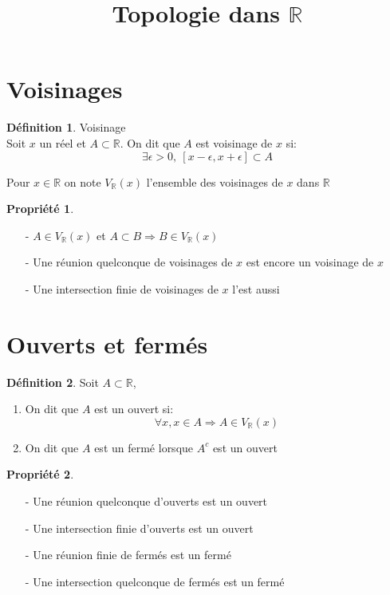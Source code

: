 \documentclass[fleqn]{article}
\title{Topologie dans $\mathbb{R}$}
\date{}
\theoremstyle{definition} \newtheorem*{defi}{D\'efinition}
\theoremstyle{definition} \newtheorem*{theo}{Th\'eor\`eme}
\theoremstyle{definition} \newtheorem*{adh}{Caract\'erisation s\'equentielle de l'adh\'erence}
\theoremstyle{definition} \newtheorem*{prop}{Propri\'et\'e}
\theoremstyle{definition} \newtheorem*{fermitude}{Caract\'erisation s\'equentielle de la fermitude}
\begin{document}
\maketitle

\section{Voisinages}
\begin{defi} Voisinage \\
	Soit $x$ un r\'eel et $A \subset \mathbb{R}$. On dit que $A$ est voisinage de $x$ si:
	\[\exists \epsilon > 0,\ [x-\epsilon, x+\epsilon] \subset A\]
\end{defi}
Pour $x \in \mathbb{R}$ on note $V_\mathbb{R}(x)$ l'ensemble des voisinages de $x$ dans $\mathbb{R}$

\begin{prop} $ $
	\begin{itemize}
		\item [-] $A \in V_\mathbb{R}(x)$ et $A \subset B \Rightarrow B \in V_\mathbb{R}(x)$
		\item [-] Une r\'eunion quelconque de voisinages de $x$ est encore un voisinage de $x$
		\item [-] Une intersection finie de voisinages de $x$ l'est aussi
	\end{itemize}
\end{prop}

\section{Ouverts et ferm\'es}
\begin{defi}
	Soit $A \subset \mathbb{R}$,
	\begin{enumerate}
		\item On dit que $A$ est un ouvert si:
			\[\forall x, x \in A \Rightarrow A \in V_\mathbb{R}(x)\]
		\item On dit que $A$ est un ferm\'e lorsque $A^c$ est un ouvert
	\end{enumerate}
\end{defi}

\begin{prop} $ $
	\begin{itemize}
		\item [-] Une r\'eunion quelconque d'ouverts est un ouvert
		\item [-] Une intersection finie d'ouverts est un ouvert
		\item [-] Une r\'eunion finie de ferm\'es est un ferm\'e
		\item [-] Une intersection quelconque de ferm\'es est un ferm\'e
	\end{itemize}
\end{prop}
\end{document}
